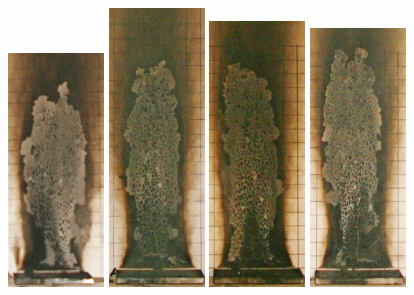 \documentclass[twoside]{uocthesis}
\begin{document}
{\begin{figure}[p]
	\includegraphics[width=1.0in]{../Figures/GBGAS_03_IMG_5575}
	\includegraphics[width=1.0in]{../Figures/GBGAS_14_IMG_5814}
	\includegraphics[width=1.0in]{../Figures/GBGAS_15_IMG_5835}
	\includegraphics[width=1.0in]{../Figures/GBGAS_16_IMG_5855}

\end{figure}}
\end{document}
